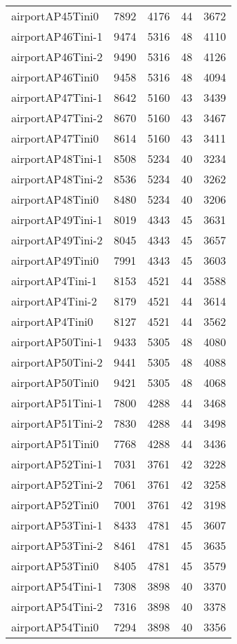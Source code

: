 \documentclass[../../../thesis.tex]{subfiles}
\begin{document}
\begin{longtable}{lrrrr}
airportAP45Tini0 & 7892 & 4176 & 44 & 3672 \\
airportAP46Tini-1 & 9474 & 5316 & 48 & 4110 \\
airportAP46Tini-2 & 9490 & 5316 & 48 & 4126 \\
airportAP46Tini0 & 9458 & 5316 & 48 & 4094 \\
airportAP47Tini-1 & 8642 & 5160 & 43 & 3439 \\
airportAP47Tini-2 & 8670 & 5160 & 43 & 3467 \\
airportAP47Tini0 & 8614 & 5160 & 43 & 3411 \\
airportAP48Tini-1 & 8508 & 5234 & 40 & 3234 \\
airportAP48Tini-2 & 8536 & 5234 & 40 & 3262 \\
airportAP48Tini0 & 8480 & 5234 & 40 & 3206 \\
airportAP49Tini-1 & 8019 & 4343 & 45 & 3631 \\
airportAP49Tini-2 & 8045 & 4343 & 45 & 3657 \\
airportAP49Tini0 & 7991 & 4343 & 45 & 3603 \\
airportAP4Tini-1 & 8153 & 4521 & 44 & 3588 \\
airportAP4Tini-2 & 8179 & 4521 & 44 & 3614 \\
airportAP4Tini0 & 8127 & 4521 & 44 & 3562 \\
airportAP50Tini-1 & 9433 & 5305 & 48 & 4080 \\
airportAP50Tini-2 & 9441 & 5305 & 48 & 4088 \\
airportAP50Tini0 & 9421 & 5305 & 48 & 4068 \\
airportAP51Tini-1 & 7800 & 4288 & 44 & 3468 \\
airportAP51Tini-2 & 7830 & 4288 & 44 & 3498 \\
airportAP51Tini0 & 7768 & 4288 & 44 & 3436 \\
airportAP52Tini-1 & 7031 & 3761 & 42 & 3228 \\
airportAP52Tini-2 & 7061 & 3761 & 42 & 3258 \\
airportAP52Tini0 & 7001 & 3761 & 42 & 3198 \\
airportAP53Tini-1 & 8433 & 4781 & 45 & 3607 \\
airportAP53Tini-2 & 8461 & 4781 & 45 & 3635 \\
airportAP53Tini0 & 8405 & 4781 & 45 & 3579 \\
airportAP54Tini-1 & 7308 & 3898 & 40 & 3370 \\
airportAP54Tini-2 & 7316 & 3898 & 40 & 3378 \\
airportAP54Tini0 & 7294 & 3898 & 40 & 3356 \\

\end{longtable}
\end{document}
